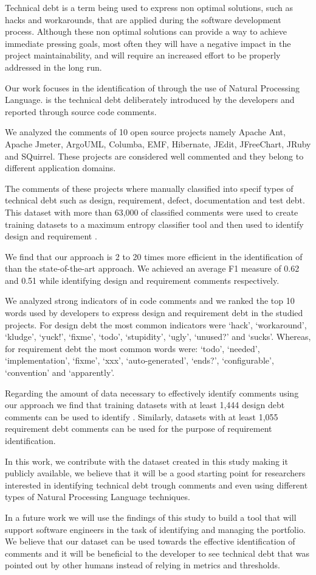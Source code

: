 Technical debt is a term being used to express non optimal solutions, such as hacks and workarounds, that are applied during the software development process. Although these non optimal solutions can provide a way to achieve immediate pressing goals, most often they will have a negative impact in the project maintainability, and will require an increased effort to be properly addressed in the long run. 

Our work focuses in the identification of \SATD through the use of Natural Processing Language. \SATD is the technical debt deliberately introduced by the developers and reported through source code comments.

We analyzed the comments of 10 open source projects namely Apache Ant, Apache Jmeter, ArgoUML, Columba, EMF, Hibernate, JEdit, JFreeChart, JRuby and SQuirrel. These projects are considered well commented and they belong to different application domains.

The comments of these projects where manually classified into specif types of technical debt such as design, requirement, defect, documentation and test debt. This dataset with more than 63,000 of classified comments were used to create training datasets to a maximum entropy classifier tool and then used to identify  design and requirement \SATD.

We find that our approach is 2 to 20 times more efficient in the identification of \SATD than the state-of-the-art approach. We achieved an average F1 measure of 0.62 and 0.51 while identifying design and requirement \SATD comments respectively. 

We analyzed strong indicators of \SATD in code comments and we ranked the top 10 words used by developers to express design and requirement debt in the studied projects. For design debt the most common indicators were `hack', `workaround', `kludge', `yuck!', `fixme', `todo', `stupidity', `ugly', `unused?' and `sucks'. Whereas, for requirement debt the most common words were: `todo', `needed', `implementation', `fixme', `xxx', `auto-generated', `ends?', `configurable', `convention' and `apparently'.
 
Regarding the amount of data necessary to effectively identify \SATD comments using our approach we find that training datasets with at least 1,444 design debt comments can be used to identify \SATD. Similarly, datasets with at least 1,055 requirement debt comments can be used for the purpose of requirement \SATD identification. 

In this work, we contribute with the dataset created in this study making it publicly available, we believe that it will be a good starting point for researchers interested in identifying technical debt trough comments and even using different types of Natural Processing Language techniques. 

In a future work we will use the findings of this study to build a tool that will support software engineers in the task of identifying and managing the \SATD portfolio. We believe that our dataset can be used towards the effective identification of \SATD comments and it will be beneficial to the developer to see technical debt that was pointed out by other humans instead of relying in metrics and thresholds. 